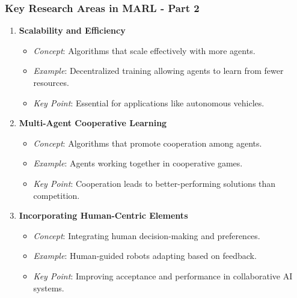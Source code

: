 \documentclass[aspectratio=169]{beamer}
\begin{document}
\begin{frame}[fragile]
  \frametitle{Key Research Areas in MARL - Part 2}
  \begin{enumerate}[resume]
    \item \textbf{Scalability and Efficiency}
      \begin{itemize}
        \item \textit{Concept}: Algorithms that scale effectively with more agents.
        \item \textit{Example}: Decentralized training allowing agents to learn from fewer resources.
        \item \textit{Key Point}: Essential for applications like autonomous vehicles.
      \end{itemize}

    \item \textbf{Multi-Agent Cooperative Learning}
      \begin{itemize}
        \item \textit{Concept}: Algorithms that promote cooperation among agents.
        \item \textit{Example}: Agents working together in cooperative games.
        \item \textit{Key Point}: Cooperation leads to better-performing solutions than competition.
      \end{itemize}
    
    \item \textbf{Incorporating Human-Centric Elements}
      \begin{itemize}
        \item \textit{Concept}: Integrating human decision-making and preferences.
        \item \textit{Example}: Human-guided robots adapting based on feedback.
        \item \textit{Key Point}: Improving acceptance and performance in collaborative AI systems.
      \end{itemize}
  \end{enumerate}
\end{frame}
\end{document}
